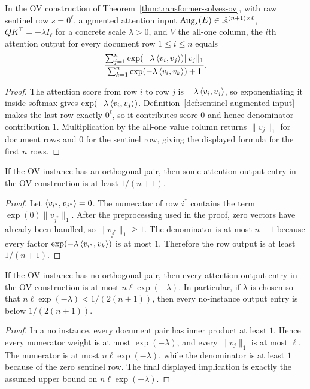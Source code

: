 \begin{lemma}
  \label{lem:ov-attention-output}
  In the OV construction of Theorem~\ref{thm:transformer-solves-ov}, with
  raw sentinel row $s=0^\ell$, augmented attention input
  $\operatorname{Aug}_s(E)\in\mathbb{R}^{(n+1)\times\ell}$, $QK^\top=-\lambda I_\ell$ for a concrete
  scale $\lambda>0$, and $V$ the all-one column, the $i$th attention output for
  every document row
  $1\leq i\leq n$ equals
  \[
    \frac{\sum_{j=1}^{n}\exp(-\lambda\left\langle v_i,v_j\right\rangle)\|v_j\|_1}
         {\sum_{k=1}^{n}\exp(-\lambda\left\langle v_i,v_k\right\rangle)+1}.
  \]
\end{lemma}
\begin{proof}
  The attention score from row $i$ to row $j$ is
  $-\lambda\left\langle v_i,v_j\right\rangle$, so exponentiating it inside softmax gives
  $\exp(-\lambda\left\langle v_i,v_j\right\rangle)$.
  Definition~\ref{def:sentinel-augmented-input} makes the last row exactly
  $0^\ell$, so it contributes score $0$ and hence denominator contribution
  $1$.  Multiplication by the all-one value column returns $\|v_j\|_1$ for
  document rows and $0$ for the sentinel row, giving the displayed formula for
  the first $n$ rows.
\end{proof}

\begin{lemma}
  \label{lem:ov-yes-gap}
  If the OV instance has an orthogonal pair, then some attention output entry in
  the OV construction is at least $1/(n+1)$.
\end{lemma}
\begin{proof}
  Let $\left\langle v_{i^*},v_{j^*}\right\rangle=0$.  The numerator of row $i^*$ contains the term
  $\exp(0)\|v_{j^*}\|_1$.  After the preprocessing used in the proof, zero
  vectors have already been handled, so $\|v_{j^*}\|_1\geq1$.  The denominator
  is at most $n+1$ because every factor
  $\exp(-\lambda\left\langle v_{i^*},v_k\right\rangle)$ is at most $1$.  Therefore the row output
  is at least $1/(n+1)$.
\end{proof}

\begin{lemma}
  \label{lem:ov-no-gap}
  If the OV instance has no orthogonal pair, then every attention output entry
  in the OV construction is at most $n\ell\exp(-\lambda)$.  In particular, if
  $\lambda$ is chosen so that
  $n\ell\exp(-\lambda)<1/(2(n+1))$, then every no-instance output entry is
  below $1/(2(n+1))$.
\end{lemma}
\begin{proof}
  In a no instance, every document pair has inner product at least $1$.  Hence
  every numerator weight is at most $\exp(-\lambda)$, and every $\|v_j\|_1$ is
  at most $\ell$.  The numerator is at most $n\ell\exp(-\lambda)$, while the
  denominator is at least $1$ because of the zero sentinel row.  The final
  displayed implication is exactly the assumed upper bound on
  $n\ell\exp(-\lambda)$.
\end{proof}

